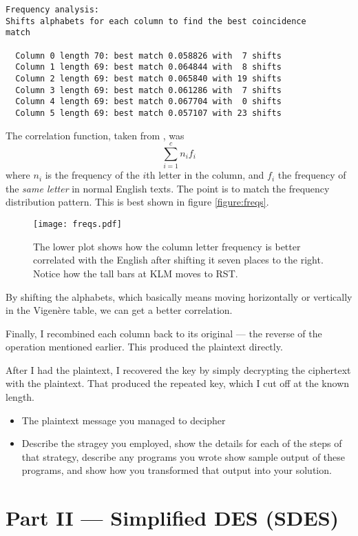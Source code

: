 \documentclass[a4paper,english,12pt]{article}
\begin{document}
\begin{verbatim}
Frequency analysis:
Shifts alphabets for each column to find the best coincidence
match

  Column 0 length 70: best match 0.058826 with  7 shifts
  Column 1 length 69: best match 0.064844 with  8 shifts
  Column 2 length 69: best match 0.065840 with 19 shifts
  Column 3 length 69: best match 0.061286 with  7 shifts
  Column 4 length 69: best match 0.067704 with  0 shifts
  Column 5 length 69: best match 0.057107 with 23 shifts
\end{verbatim}

The correlation function, taken from \cite{wiki:coincidence}, was
\[
  \sum_{i=1}^{c} n_i f_i
\]
where $n_i$ is the frequency of the $i$th letter in the column, and $f_i$ the
frequency of the \textit{same letter} in normal English texts. The point is to
match the frequency distribution pattern. This is best shown in figure
\vref{figure:freqs}.

\begin{figure}
  \centering
  \texttt{[image: freqs.pdf]}
  \caption{The lower plot shows how the column letter frequency is better
  correlated with the English after shifting it seven places to the right.
  Notice how the tall bars at KLM moves to RST.}
  \label{figure:freqs}
\end{figure}

By shifting the alphabets, which basically means moving horizontally or
vertically in the Vigenère table, we can get a better correlation.

Finally, I recombined each column back to its original --- the reverse of the
operation mentioned earlier. This produced the plaintext directly.

After I had the plaintext, I recovered the key by simply decrypting the
ciphertext with the plaintext. That produced the repeated key, which I cut off
at the known length.

\begin{itemize}
  \item The plaintext message you managed to decipher
  \item Describe the stragey you employed, show the details for each of the
    steps of that strategy, describe any programs you wrote show sample output
    of these programs, and show how you transformed that output into your
    solution.
\end{itemize}

\section{Part II --- Simplified DES (SDES)}
\end{document}
